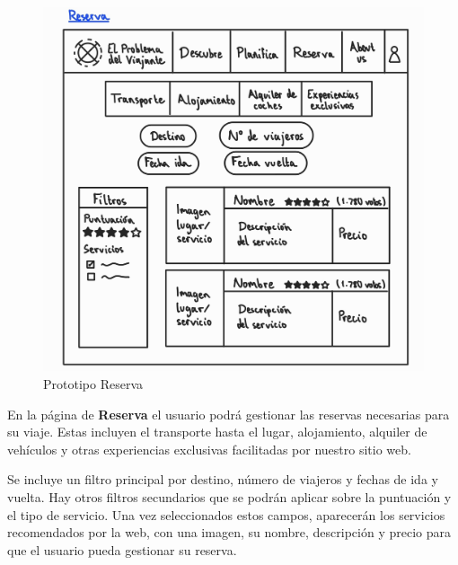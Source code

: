 \documentclass[11pt, a4paper]{book}
\begin{document}
	\begin{figure} [H]
		\centering
		\includegraphics[width=\textwidth]{4-reserva.jpg}
		\caption{Prototipo Reserva}
	\end{figure} 

	En la página de \textbf{Reserva} el usuario podrá gestionar las reservas necesarias para su viaje. Estas incluyen el transporte hasta el lugar, alojamiento, alquiler de vehículos y otras experiencias exclusivas facilitadas por nuestro sitio web.
	
	Se incluye un filtro principal por destino, número de viajeros y fechas de ida y vuelta. Hay otros filtros secundarios que se podrán aplicar sobre la puntuación y el tipo de servicio. Una vez seleccionados estos campos, aparecerán los servicios recomendados por la web, con una imagen, su nombre, descripción y precio para que el usuario pueda gestionar su reserva.

	\newpage
\end{document}
